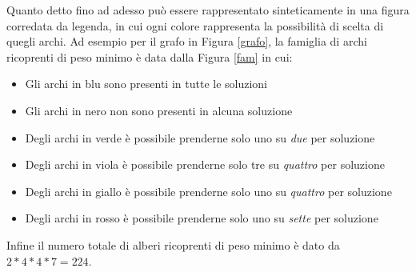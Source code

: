 \documentclass[12pt,a4paper,twoside]{article}
\theoremstyle{definition}
\theoremstyle{definition}
\theoremstyle{theorem}
\begin{document}
	Quanto detto fino ad adesso può essere rappresentato sinteticamente in una figura corredata da legenda, in cui ogni colore rappresenta la possibilità di scelta di quegli archi. Ad esempio per il grafo in Figura \ref{grafo}, la famiglia di archi ricoprenti di peso minimo è data dalla Figura \ref{fam} in cui:
	\begin{itemize}
		\item Gli archi in blu sono presenti in tutte le soluzioni
		\item Gli archi in nero non sono presenti in alcuna soluzione
		\item Degli archi in verde è possibile prenderne solo uno su \emph{due} per soluzione
		\item Degli archi in viola è possibile prenderne solo tre su \emph{quattro} per soluzione 
		\item Degli archi in giallo è possibile prenderne solo uno su \emph{quattro} per soluzione 
		\item Degli archi in rosso è possibile prenderne solo uno su \emph{sette} per soluzione 
	\end{itemize}
	
	Infine il numero totale di alberi ricoprenti di peso minimo è dato da $2*4*4*7=224$.
	
\end{document}
